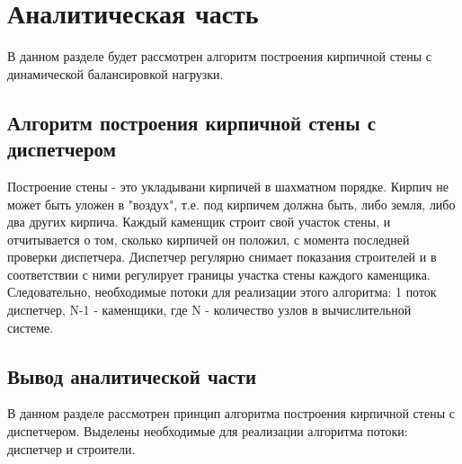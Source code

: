\chapter{Аналитическая часть}\label{Analis}

В данном разделе будет рассмотрен алгоритм построения кирпичной стены с динамической балансировкой нагрузки. 

\section{Алгоритм построения кирпичной стены с диспетчером}\label{BubbleSort}

Построение стены - это укладывани кирпичей в шахматном порядке. Кирпич не может быть уложен в "воздух", т.е. под кирпичем должна быть,
либо земля, либо два других кирпича. 
Каждый каменщик строит свой участок стены, и отчитывается о том, сколько кирпичей он положил, с момента последней проверки диспетчера.
Диспетчер регулярно снимает показания строителей и в соответствии с ними регулирует границы участка стены каждого каменщика.
Следовательно, необходимые потоки для реализации этого алгоритма: 1 поток диспетчер, N-1 - каменщики, где N - количество узлов в 
вычислительной системе.

\section{Вывод аналитической части}\label{End_analis_chapter}

В данном разделе рассмотрен принцип алгоритма построения кирпичной стены с диспетчером. Выделены необходимые для реализации алгоритма
потоки: диспетчер и строители.
 
